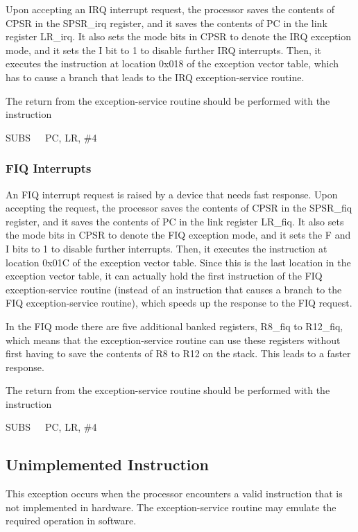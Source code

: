 \documentclass[11pt, twoside, pdftex]{article}
\begin{document}
Upon accepting an IRQ interrupt request, the processor 
saves the contents of CPSR in the SPSR\_irq register, and
it saves the contents of PC in the link register LR\_irq.
It also sets the mode bits in CPSR to denote the IRQ exception
mode, and it sets the I bit to 1 to disable further IRQ
interrupts. Then, it executes the instruction at location
0x018 of the exception vector table, which has to cause
a branch that leads to the IRQ exception-service routine.

The return from the exception-service routine should be performed
with the instruction
\begin{center}
SUBS~~~PC, LR, \#4
\end{center}
\noindent

\subsubsection{FIQ Interrupts}

An FIQ interrupt request is raised by a device that needs fast
response. Upon accepting the request, the processor 
saves the contents of CPSR in the SPSR\_fiq register, and
it saves the contents of PC in the link register LR\_fiq.
It also sets the mode bits in CPSR to denote the FIQ exception
mode, and it sets the F and I bits to 1 to disable further
interrupts. Then, it executes the instruction at location
0x01C of the exception vector table. Since this is the last 
location in the exception vector table, it can actually hold
the first instruction of the FIQ exception-service routine
(instead of an instruction that causes a branch to the FIQ
exception-service routine), which speeds up the response to
the FIQ request.

In the FIQ mode there are five additional banked registers,
R8\_fiq to R12\_fiq, which means that the exception-service 
routine can use these registers without first having to save the 
contents of R8 to R12 on the stack. This leads to a faster
response.

The return from the exception-service routine should be performed
with the instruction
\begin{center}
SUBS~~~PC, LR, \#4
\end{center}
\noindent

\subsection{Unimplemented Instruction}

This exception occurs when the processor encounters a valid
instruction that is not implemented in hardware. 
The exception-service routine may emulate the required operation
in software.
\end{document}
